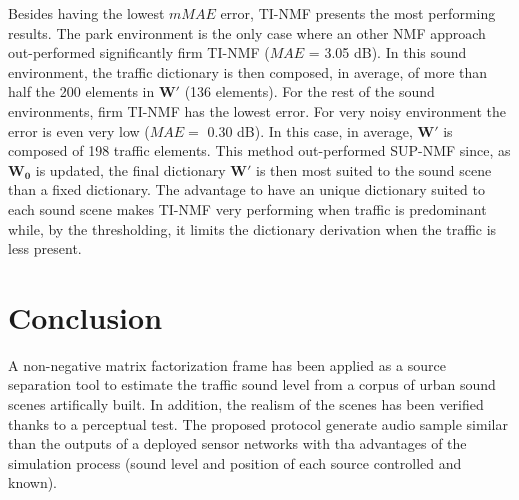 \documentclass[review,5p,twocolumn,sort&compress,times]{elsarticle}
\begin{document}
Besides having the lowest $mMAE$ error, TI-NMF presents the most performing results. The park environment is the only case where an other NMF approach out-performed significantly firm TI-NMF ($MAE$ = 3.05 dB). In this sound environment, the traffic dictionary is then composed, in average, of more than half the 200 elements in $\mathbf{W'}$ (136 elements). For the rest of the sound environments, firm TI-NMF has the lowest error. For very noisy environment the error is even very low ($MAE=$ 0.30 dB). In this case, in average, $\mathbf{W'}$ is composed of 198 traffic elements. This method out-performed SUP-NMF since, as $\mathbf{W_0}$ is updated, the final dictionary $\mathbf{W'}$ is then most suited to the sound scene than a fixed dictionary. The advantage to have an unique dictionary suited to each sound scene makes TI-NMF very performing when traffic is predominant while, by the thresholding, it limits the dictionary derivation when the traffic is less present.

\section{Conclusion}

A non-negative matrix factorization frame has been applied as a source separation tool to estimate the traffic sound level  from a corpus of urban sound scenes artifically built. In addition, the realism of the scenes has been verified thanks to a perceptual test. The proposed protocol generate audio sample similar than the outputs of a deployed sensor networks with tha advantages of the simulation process (sound level and position of each source controlled and known).
\end{document}
